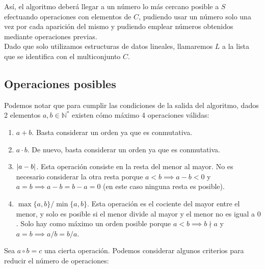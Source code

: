 Así, el algoritmo deberá llegar a un número lo más cercano posible a $S$
efectuando operaciones con elementos de $C$, pudiendo usar un número
solo una vez por cada aparición del mismo y pudiendo emplear números
obtenidos mediante operaciones previas. \\

Dado que solo utilizamos estructuras de datos lineales, llamaremos $L$ a la lista
que se identifica con el multiconjunto $C$.

\subsection{Operaciones posibles}

Podemos notar que para cumplir las condiciones de la salida del algoritmo,
dados 2 elementos $a,b \in \mathbb{N}^{\ast}$ existen cómo máximo 4 operaciones válidas:

\begin{enumerate}
	\item $a+b$. Basta considerar un orden ya que es conmutativa.
	\item $a\cdot b$. De nuevo, basta considerar un orden ya que es conmutativa.
	\item $|a-b|$. Esta operación consiste en la resta del menor al mayor. No es necesario considerar la otra resta porque $a < b \implies a-b < 0$ y $a = b \implies a-b = b-a = 0$ (en este caso ninguna resta es posible).
	\item $\max\{a,b\}/\min\{a,b\}$. Esta operación es el cociente del mayor entre el menor, y solo es posible si el menor divide al mayor y el menor no es igual a $0$. Solo hay como máximo un orden posible porque $a < b \implies b \nmid a$ y $a = b \implies a/b = b/a$.
\end{enumerate}

Sea $a \circ b = c$ una cierta operación.
Podemos considerar algunos criterios para reducir el número de operaciones:

